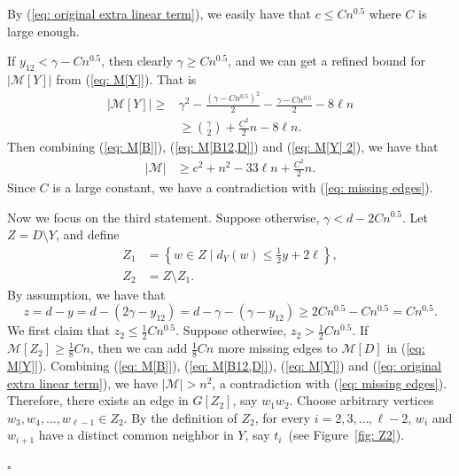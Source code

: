 \documentclass[12pt]{article}%
\newenvironment{proof}{{\noindent\it Proof.}}{\hfill $\square$\par}
\begin{document}
\begin{proof}
	By (\ref{eq: original extra linear term}), we easily have that $c \le C n^{0.5}$ where $C$ is large enough.

	If $y_{12} < \gamma - C n^{0.5}$, then clearly $\gamma \ge Cn^{0.5}$, and we can get a refined bound for $|\mathcal{M}[Y]|$ from (\ref{eq: M[Y]}). That is
	\begin{equation}\label{eq: M[Y] 2}
	\begin{aligned}
		|\mathcal{M}[Y]| \ge & \gamma^2 - \frac{(\gamma - C n^{0.5})^2}{2} - \frac{\gamma - C n^{0.5}}{2} - 8\ell n \\
		& \ge \binom{\gamma}{2} + \frac{C^2}{2} n - 8\ell n.
	\end{aligned}
	\end{equation}
		Then combining (\ref{eq: M[B]}), (\ref{eq: M[B12,D]}) and (\ref{eq: M[Y] 2}), we have that
	\begin{equation}\label{eq: lb M}
	\begin{aligned}
		 |\mathcal{M}| & \ge c^2 + n^2 - 33\ell n  +\frac{C^2}{2}n.
	\end{aligned}
	\end{equation}
	Since $C$ is a large constant, we have a contradiction with (\ref{eq: missing edges}).

	Now we focus on the third statement.
	Suppose otherwise, $\gamma < d - 2C n^{0.5}$.
	Let $Z = D\setminus Y$, and define
	\begin{equation*}
	\begin{aligned}
		Z_1 &= \left\{w \in Z \mid d_Y(w) \le \frac{1}{2}y +2\ell \right\},\\
		Z_2 &= Z\setminus Z_1.
	\end{aligned}
	\end{equation*}
	By assumption, we have that $$z = d - y=d-(2\gamma-y_{12})=d-\gamma-(\gamma-y_{12}) \ge 2C n^{0.5}-C n^{0.5}=C n^{0.5}.$$
	We first claim that $z_2 \le \frac{1}{2}C n^{0.5}$.
	Suppose otherwise, $z_2 > \frac{1}{2}C n^{0.5}$.
	If $\mathcal{M}[Z_2] \ge \frac{1}{8}C n$, then we can add $\frac{1}{8}C n$ more missing edges to $\mathcal{M}[D]$ in (\ref{eq: M[Y]}). Combining (\ref{eq: M[B]}), (\ref{eq: M[B12,D]}), (\ref{eq: M[Y]}) and (\ref{eq: original extra linear term}), we have $|\mathcal{M}|> n^2$, a contradiction with (\ref{eq: missing edges}).
	Therefore, there exists an edge in $G[Z_2]$, say $w_1w_2$.
	Choose arbitrary vertices $w_3, w_4,\ldots,w_{\ell-1} \in Z_2$.
	By the definition of $Z_2$, for every $i=2,3,\ldots,\ell-2$, $w_i$ and $w_{i+1}$ have a distinct common neighbor in $Y$, say $t_i$~(see Figure~\ref{fig: Z2}).


\end{proof}
\end{document}
